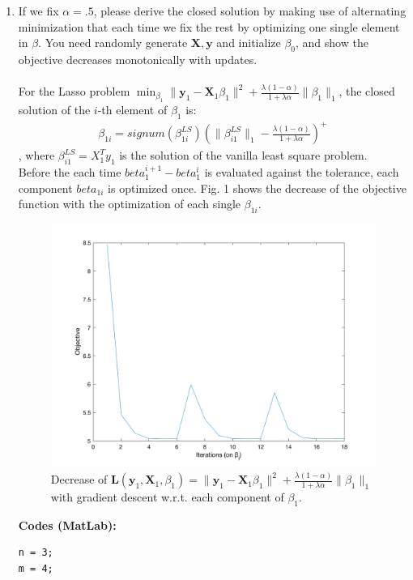 \documentclass[11pt]{article}
\newcommand{\mtx}[1]{\mathbf{#1}}
\newcommand{\vct}[1]{\mathbf{#1}}
\def \mL {\mtx{L}}
\def \mX {\mtx{X}}
\def \vy {\vct{y}}
\begin{document}
\begin{enumerate}
	\item If we fix $\alpha=.5$, please derive the closed solution by making use of alternating minimization that each time we fix the rest by optimizing one single element in $\beta$. You need randomly generate $\mX, \vy$ and initialize  $\beta_0$, and show the objective decreases monotonically with updates.\\ \\
	For the Lasso problem $\min_{\beta_1} \|\vy_1-\mX_1\beta_1\|^2 + \frac{\lambda(1-\alpha)}{1+\lambda\alpha}\|\beta_1\|_1$, the closed solution of the $i$-th element of $\beta_1$ is:
	\begin{equation}
		\begin{aligned}
			\beta_{1i} = signum(\beta_{1i}^{LS})(\|\beta_{i1}^{LS}\|_1-\frac{\lambda(1-\alpha)}{1+\lambda\alpha})^+
		\end{aligned}
	\end{equation}
, where $\beta_{i1}^{LS}=X_1^Ty_1$ is the solution of the vanilla least square problem.\\
Before the each time $beta_1^{i+1}-beta_1^{i}$ is evaluated against the tolerance, each component $beta_{1i}$ is optimized once. Fig. 1 shows the decrease of the objective function with the optimization of each single $\beta_{1i}$.
\begin{figure}[H] %
	\centering\includegraphics[width=0.8\linewidth]{fin_1_2.png}
	\caption{Decrease of $\mL(\vy_1,\mX_1,\beta_1) = \|\vy_1-\mX_1\beta_1\|^2 + \frac{\lambda(1-\alpha)}{1+\lambda\alpha}\|\beta_1\|_1$ with gradient descent w.r.t. each component of $\beta_1$.} %
	\label{fig:fig6}  %
\end{figure}
\textbf{Codes (MatLab):}
\begin{verbatim}
n = 3;
m = 4;


\end{verbatim}
\end{enumerate}
\end{document}
